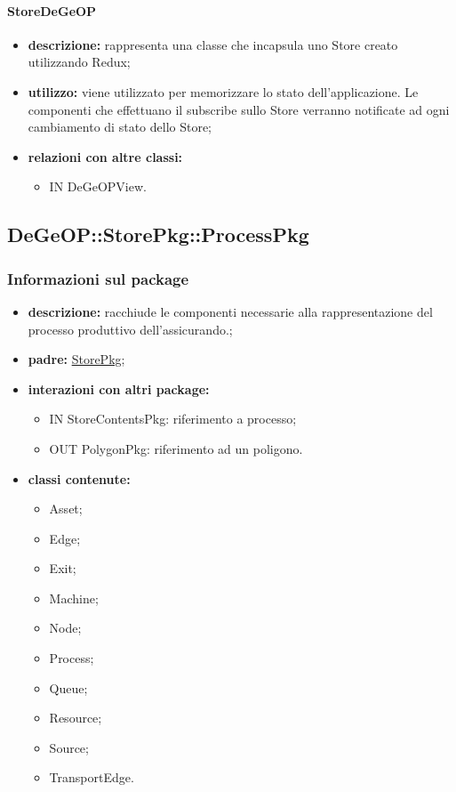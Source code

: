 \paragraph{StoreDeGeOP}
\begin{itemize}
	\item \textbf{descrizione:} rappresenta una classe che incapsula uno Store creato utilizzando Redux;
	\item \textbf{utilizzo:} viene utilizzato per memorizzare lo stato dell'applicazione.
	Le componenti che effettuano il subscribe sullo Store verranno notificate ad ogni cambiamento di stato dello Store;
	\item \textbf{relazioni con altre classi:} 
	\begin{itemize}
		\item IN DeGeOPView.
	\end{itemize}
\end{itemize}
\newpage
\subsection{DeGeOP::StorePkg::ProcessPkg}
\label{pkg::ProcessPkg}
\subsubsection{Informazioni sul package}
\begin{itemize}
	\item \textbf{descrizione:} racchiude le componenti necessarie alla rappresentazione del processo produttivo dell'assicurando.;
	\item \textbf{padre:} \hyperref[pkg::StorePkg]{StorePkg};
	\item \textbf{interazioni con altri package:} 
	\begin{itemize}
		\item IN StoreContentsPkg: riferimento a processo;
		\item OUT PolygonPkg: riferimento ad un poligono.
	\end{itemize}
	\item \textbf{classi contenute:}
	\begin{itemize}
		\item Asset;
		\item Edge;
		\item Exit;
		\item Machine;
		\item Node;
		\item Process;
		\item Queue;
		\item Resource;
		\item Source;
		\item TransportEdge.
	\end{itemize}
\end{itemize}
